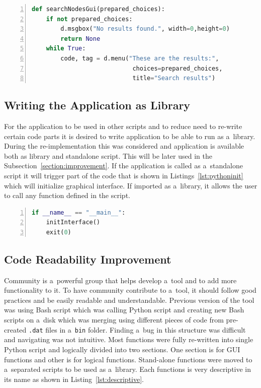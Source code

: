 {\noindent\begin{minipage}{\linewidth}
\begin{lstlisting}[language=Python, numbers=left, label={lst:removingresultlimit}, caption=Removing result limitation by passing choices as a~list argument., frame=single, showstringspaces=false, keywordstyle=\color{blue},captionpos=b]
def searchNodesGui(prepared_choices):
	if not prepared_choices:
		d.msgbox("No results found.", width=0,height=0)
		return None
	while True:
		code, tag = d.menu("These are the results:",
							choices=prepared_choices,
							title="Search results")
\end{lstlisting}
\end{minipage}

\subsection{Writing the Application as Library}
For the application to be used in other scripts and to reduce need to re-write certain code parts it is desired to write application to be able to run as a~library. During the re-implementation this was considered and application is available both as library and standalone script. This will be later used in the Subsection~\ref{section:improvement}. If the application is called as a~standalone script it will trigger part of the code that is shown in Listings~\ref{lst:pythoninit} which will initialize graphical interface. If imported as a~library, it allows the user to call any function defined in the script.

{\noindent\begin{minipage}{\linewidth}
\begin{lstlisting}[language=Python, numbers=left, label={lst:pythoninit}, caption=Condition to recognize that application is being called as a~standalone script., frame=single, showstringspaces=false, breaklines=true, keywordstyle=\color{blue},captionpos=b]
if __name__ == "__main__":
	initInterface()
	exit(0)
\end{lstlisting}
\end{minipage}

\subsection{Code Readability Improvement}
\label{subsection:readability}
Community is a~powerful group that helps develop a~tool and to add more functionality to it. To have community contribute to a~tool, it should follow good practices and be easily readable and understandable. Previous version of the tool was using Bash script which was calling Python script and creating new Bash scripts on a~disk which was merging using different pieces of code from pre-created \texttt{.dat} files in a~\texttt{bin} folder. Finding a~bug in this structure was difficult and navigating was not intuitive. Most functions were fully re-written into single Python script and logically divided into two sections. One section is for GUI functions and other is for logical functions. Stand-alone functions were moved to a~separated scripts to be used as a~library. Each functions is very descriptive in its name as shown in Listing~\ref{lst:descriptive}.

}}
